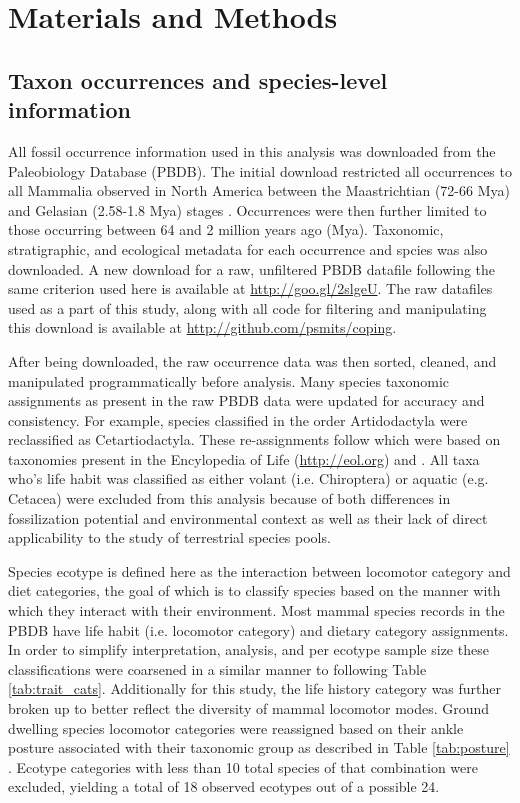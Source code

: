 \documentclass[12pt,letterpaper]{article}
\begin{document}
\section*{Materials and Methods}

\subsection*{Taxon occurrences and species-level information}
All fossil occurrence information used in this analysis was downloaded from the Paleobiology Database (PBDB). The initial download restricted all occurrences to all Mammalia observed in North America between the Maastrichtian (72-66 Mya) and Gelasian (2.58-1.8 Mya) stages \citep{Cohen2015}. Occurrences were then further limited to those occurring between 64 and 2 million years ago (Mya). Taxonomic, stratigraphic, and ecological metadata for each occurrence and spcies was also downloaded. A new download for a raw, unfiltered PBDB datafile following the same criterion used here is available at \url{http://goo.gl/2slgeU}. The raw datafiles used as a part of this study, along with all code for filtering and manipulating this download is available at \url{http://github.com/psmits/coping}.

After being downloaded, the raw occurrence data was then sorted, cleaned, and manipulated programmatically before analysis. Many species taxonomic assignments as present in the raw PBDB data were updated for accuracy and consistency. For example, species classified in the order Artidodactyla were reclassified as Cetartiodactyla. These re-assignments follow \citet{Smits2015b} which were based on taxonomies present in the Encylopedia of Life (\url{http://eol.org}) and \citet{Janis1998,Janis2008}. All taxa who's life habit was classified as either volant (i.e. Chiroptera) or aquatic (e.g. Cetacea) were excluded from this analysis because of both differences in fossilization potential and environmental context as well as their lack of direct applicability to the study of terrestrial species pools.

Species ecotype is defined here as the interaction between locomotor category and diet categories, the goal of which is to classify species based on the manner with which they interact with their environment. Most mammal species records in the PBDB have life habit (i.e. locomotor category) and dietary category assignments. In order to simplify interpretation, analysis, and per ecotype sample size these classifications were coarsened in a similar manner to \citep{Smits2015b} following Table \ref{tab:trait_cats}. Additionally for this study, the life history category was further broken up to better reflect the diversity of mammal locomotor modes. Ground dwelling species locomotor categories were reassigned based on their ankle posture associated with their taxonomic group as described in Table \ref{tab:posture} \citep{Carrano1999}. Ecotype categories with less than 10 total species of that combination were excluded, yielding a total of 18 observed ecotypes out of a possible 24.
\end{document}
